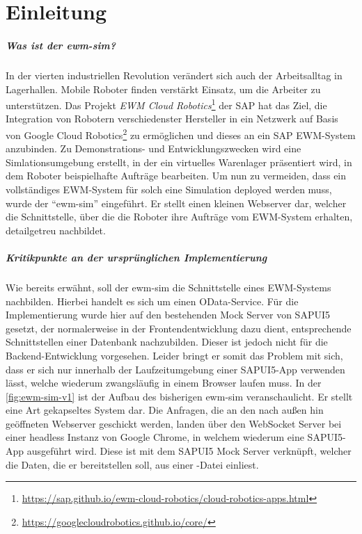 \chapter{Einleitung}

\paragraph{Was ist der \ac{ewm-sim}?}
In der vierten industriellen Revolution verändert sich auch der Arbeitsalltag in Lagerhallen.
Mobile Roboter finden verstärkt Einsatz, um die Arbeiter zu unterstützen.
Das Projekt \emph{\ac{EWM} Cloud Robotics}\footnote{\url{https://sap.github.io/ewm-cloud-robotics/cloud-robotics-apps.html}} der SAP hat das Ziel, die Integration von Robotern verschiedenster Hersteller in ein Netzwerk auf Basis von Google Cloud Robotics\footnote{\url{https://googlecloudrobotics.github.io/core/}} zu ermöglichen und dieses an ein SAP \ac{EWM}-System anzubinden.
Zu Demonstrations- und Entwicklungszwecken wird eine Simlationsumgebung erstellt, in der ein virtuelles Warenlager präsentiert wird, in dem Roboter beispielhafte Aufträge bearbeiten.
Um nun zu vermeiden, dass ein vollständiges \ac{EWM}-System für solch eine Simulation deployed werden muss, wurde der \enquote{\ac{ewm-sim}} eingeführt.
Er stellt einen kleinen Webserver dar, welcher die Schnittstelle, über die die Roboter ihre Aufträge vom \ac{EWM}-System erhalten, detailgetreu nachbildet.

\paragraph{Kritikpunkte an der ursprünglichen Implementierung}
Wie bereits erwähnt, soll der \ac{ewm-sim} die Schnittstelle eines \ac{EWM}-Systems nachbilden. Hierbei handelt es sich um einen \ac{OData}-Service.
Für die Implementierung wurde hier auf den bestehenden Mock Server von SAPUI5 gesetzt, der normalerweise in der Frontendentwicklung dazu dient, entsprechende Schnittstellen einer Datenbank nachzubilden.
Dieser ist jedoch nicht für die Backend-Entwicklung vorgesehen.
Leider bringt er somit das Problem mit sich, dass er sich nur innerhalb der Laufzeitumgebung einer SAPUI5-App verwenden lässt, welche wiederum zwangsläufig in einem Browser laufen muss.
In der \autoref{fig:ewm-sim-v1} ist der Aufbau des bisherigen \ac{ewm-sim} veranschaulicht.
Er stellt eine Art gekapseltes System dar.
Die Anfragen, die an den nach außen hin geöffneten Webserver geschickt werden, landen über den WebSocket Server bei einer headless Instanz von Google Chrome, in welchem wiederum eine SAPUI5-App ausgeführt wird.
Diese ist mit dem SAPUI5 Mock Server verknüpft, welcher die Daten, die er bereitstellen soll, aus einer -Datei einliest.

